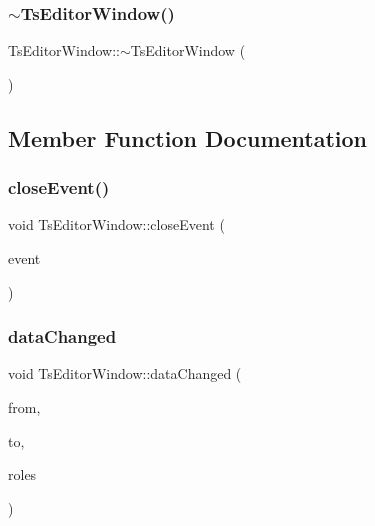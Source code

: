 \subsubsection{\texorpdfstring{$\sim$TsEditorWindow()}{~TsEditorWindow()}}
{\footnotesize\ttfamily Ts\+Editor\+Window\+::$\sim$\+Ts\+Editor\+Window (\begin{DoxyParamCaption}{ }\end{DoxyParamCaption})}



\subsection{Member Function Documentation}
\mbox{\label{class_ts_editor_window_a096813837956da71e648bfad57459bfb}} 
\subsubsection{\texorpdfstring{closeEvent()}{closeEvent()}}
{\footnotesize\ttfamily void Ts\+Editor\+Window\+::close\+Event (\begin{DoxyParamCaption}\item[{Q\+Close\+Event $\ast$}]{event }\end{DoxyParamCaption})\hspace{0.3cm}{\ttfamily [protected]}}

\mbox{\label{class_ts_editor_window_a4db9a8f5f2270164a7a09d32f5e5c57a}} 
\subsubsection{\texorpdfstring{dataChanged}{dataChanged}}
{\footnotesize\ttfamily void Ts\+Editor\+Window\+::data\+Changed (\begin{DoxyParamCaption}\item[{Q\+Model\+Index}]{from,  }\item[{Q\+Model\+Index}]{to,  }\item[{Q\+Vector$<$ int $>$}]{roles }\end{DoxyParamCaption})\hspace{0.3cm}{\ttfamily [slot]}}

